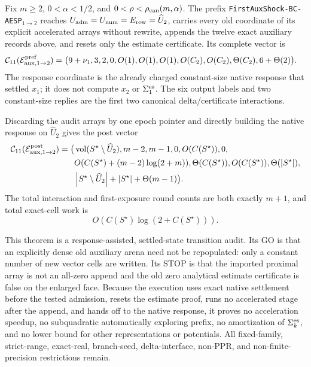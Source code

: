\begin{theorem}
\label{thm:branch-caterpillar-first-auxiliary-shock-handoff}
Fix $m\geq2$, $0<\alpha<1/2$, and
$0<\rho<\rho_{\rm can}(m,\alpha)$.  The prefix
\texttt{FirstAuxShock-BC-AESP}$_{1\to2}$ reaches
$U_{\rm adm}=U_{\rm num}=E_{\rm row}=\widehat U_2$, carries every old
coordinate of its explicit accelerated arrays without rewrite, appends the
twelve exact auxiliary records above, and resets only the estimate
certificate.  Its complete vector is
\begin{equation}
 \begin{aligned}
 \mathcal C_{11}(\mathcal E_{\rm aux,1\to2}^{\rm pref})=
 \bigl(&9+\nu_1,3,2,0,O(1),O(1),O(1),
 O(C_2),O(C_2),\Theta(C_2),6+\Theta(2)\bigr).
 \end{aligned}
 \label{eq:branch-caterpillar-first-auxiliary-prefix-eleven-vector}
\end{equation}
The response coordinate is the already charged constant-size native response
that settled $x_1$; it does not compute $x_2$ or
$\Sigma_1^{\rm es}$.  The six output labels and two constant-size replies
are the first two canonical delta/certificate interactions.

Discarding the audit arrays by one epoch pointer and directly building the
native response on $\widehat U_2$ gives the post vector
\begin{equation}
 \begin{aligned}
 \mathcal C_{11}(\mathcal E_{\rm aux,1\to2}^{\rm post})=
 \bigl(&\operatorname{vol}(S^\star\setminus\widehat U_2),m-2,m-1,0,
 O(C(S^\star)),0,\\
 &O(C(S^\star)+(m-2)\log(2+m)),
 \Theta(C(S^\star)),O(C(S^\star)),\Theta(\left\lvert S^\star \right\rvert),\\
 &\left\lvert S^\star\setminus\widehat U_2 \right\rvert
  +\left\lvert S^\star \right\rvert+\Theta(m-1)\bigr).
 \end{aligned}
 \label{eq:branch-caterpillar-first-auxiliary-post-eleven-vector}
\end{equation}
The total interaction and first-exposure round counts are both exactly
$m+1$, and total exact-cell work is
\begin{equation}
 O\!\left(C(S^\star)\log(2+C(S^\star))\right).
 \label{eq:branch-caterpillar-first-auxiliary-total-work}
\end{equation}

This theorem is a response-assisted, settled-state transition audit.  Its GO
is that an explicitly dense old auxiliary arena need not be repopulated:
only a constant number of new vector cells are written.  Its STOP is that the
imported proximal array is not an all-zero append and the old zero analytical
estimate certificate is false on the enlarged face.  Because the execution
uses exact native settlement before the tested admission, resets the
estimate proof, runs no accelerated stage after the append, and hands off to
the native response, it proves no acceleration speedup, no subquadratic
automatically exploring prefix, no amortization of
$\Sigma_k^{\rm es}$, and no lower bound for other representations or
potentials.  All fixed-family, strict-range, exact-real, branch-seed,
delta-interface, non-PPR, and non-finite-precision restrictions remain.
\end{theorem}
